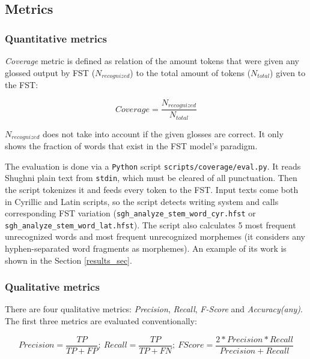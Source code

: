 \subsection{Metrics} \label{metrics_section}
\subsubsection{Quantitative metrics}
\textit{Coverage} metric is defined as relation of the amount tokens that were given any glossed output by FST ($N_{recognized}$) to the total amount of tokens ($N_{total}$) given to the FST:

\[Coverage = \frac{N_{recognized}}{N_{total}}\]

$N_{recognized}$ does not take into account if the given glosses are correct. It only shows the fraction of words that exist in the FST model's paradigm. 

The evaluation is done via a \texttt{Python} script \texttt{scripts/coverage/eval.py}. It reads Shughni plain text from \texttt{stdin}, which must be cleared of all punctuation. Then the script tokenizes it and feeds every token to the FST. Input texts come both in Cyrillic and Latin scripts, so the script detects writing system and calls corresponding FST variation (\texttt{sgh\_analyze\_stem\_word\_cyr.hfst} or \texttt{sgh\_analyze\_stem\_word\_lat.hfst}). The script also calculates 5 most frequent unrecognized words and most frequent unrecognized morphemes (it considers any hyphen-separated word fragments as morphemes). An example of its work is shown in the Section \ref{results_sec}.

\subsubsection*{Qualitative metrics}
There are four qualitative metrics: \textit{Precision}, \textit{Recall}, \textit{F-Score} and \textit{Accuracy(any)}. The first three metrics are evaluated conventionally:

\[Precision = \frac{TP}{TP + FP};\ 
Recall = \frac{TP}{TP + FN};\ 
FScore = \frac{2*Precision*Recall}{Precision + Recall}\]

